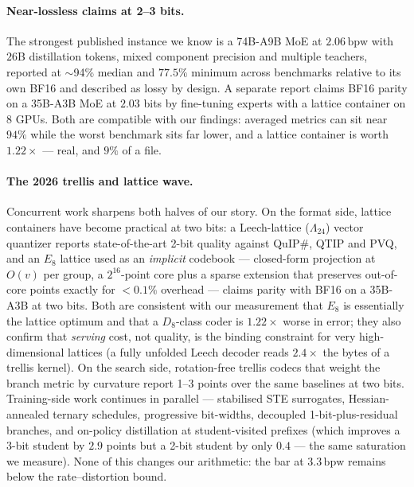 \documentclass[11pt,a4paper]{article}
\newcommand{\bpw}{\,\mathrm{bpw}}
\begin{document}
\paragraph{Near-lossless claims at 2--3 bits.} The strongest published instance we know is a
74B-A9B MoE at $2.06\bpw$ with $26$B distillation tokens, mixed component precision and multiple
teachers, reported at $\sim$94\% median and $77.5\%$ minimum across benchmarks relative to its own
BF16 and described as lossy by design. A separate report claims BF16 parity on a 35B-A3B MoE at
$2.03$ bits by fine-tuning experts with a lattice container on 8 GPUs. Both are compatible with
our findings: averaged metrics can sit near $94\%$ while the worst benchmark sits far lower, and a
lattice container is worth $1.22\times$ --- real, and $9\%$ of a file.

\paragraph{The 2026 trellis and lattice wave.} Concurrent work sharpens both halves of our story.
On the format side, lattice containers have become practical at two bits: a Leech-lattice
($\Lambda_{24}$) vector quantizer reports state-of-the-art 2-bit quality against QuIP\#, QTIP and
PVQ, and an $E_8$ lattice used as an \emph{implicit} codebook --- closed-form projection at $O(v)$
per group, a $2^{16}$-point core plus a sparse extension that preserves out-of-core points exactly
for $<0.1\%$ overhead --- claims parity with BF16 on a 35B-A3B at two bits. Both are consistent
with our measurement that $E_8$ is essentially the lattice optimum and that a $D_8$-class coder is
$1.22\times$ worse in error; they also confirm that \emph{serving} cost, not quality, is the
binding constraint for very high-dimensional lattices (a fully unfolded Leech decoder reads
$2.4\times$ the bytes of a trellis kernel). On the search side, rotation-free trellis codecs that
weight the branch metric by curvature report 1--3 points over the same baselines at two bits.
Training-side work continues in parallel --- stabilised STE surrogates, Hessian-annealed ternary
schedules, progressive bit-widths, decoupled 1-bit-plus-residual branches, and on-policy
distillation at student-visited prefixes (which improves a 3-bit student by $2.9$ points but a
2-bit student by only $0.4$ --- the same saturation we measure). None of this changes our
arithmetic: the bar at $3.3\bpw$ remains below the rate--distortion bound.
\end{document}
